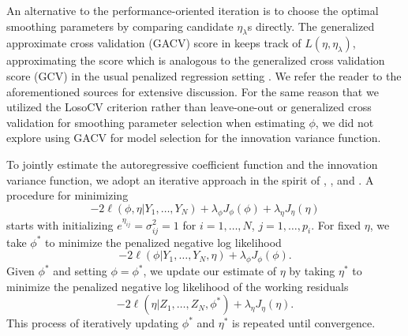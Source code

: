 \bigskip

An alternative to the performance-oriented iteration is to choose the optimal smoothing parameters by comparing candidate $\eta_\lambda$s directly. The generalized approximate cross validation (GACV) score in \cite{xiang1996generalized} keeps track of $L\left( \eta,\eta_\lambda \right)$, approximating the score which is analogous to the generalized cross validation score (GCV) in the usual penalized regression setting \citep{wahba1990spline}. We refer the reader to the aforementioned sources for extensive discussion. For the same reason that we utilized the LosoCV criterion rather than leave-one-out or generalized cross validation for smoothing parameter selection when estimating $\phi$, we did not explore using GACV for model selection for the innovation variance function.

\bigskip

To jointly estimate the autoregressive coefficient function and the innovation variance function, we adopt an iterative approach in the spirit of \cite{huang2006covariance}, \cite{huang2007estimation}, and \cite{pourahmadi2000maximum}. A procedure for minimizing 
\[
-2\ell\left(\phi,\eta \vert Y_1, \dots, Y_N  \right) + \lambda_\phi  J_\phi\left(\phi\right) + \lambda_\eta  J_\eta\left(\eta\right)
\]
starts with initializing $e^{\eta_{ij}} = \sigma^2_{ij} = 1$ for $i = 1,\dots, N$, $j = 1,\dots, p_i$.  For fixed $\eta$, we take $\phi^*$ to minimize the penalized negative log likelihood 
\[
-2\ell\left(\phi\vert Y_1, \dots, Y_N, \eta\right) + \lambda_\phi  J_\phi\left(\phi\right).
\]
\noindent
Given $\phi^*$ and setting $\phi = \phi^*$, we update our estimate of $\eta$ by taking $\eta^*$ to minimize the penalized negative log likelihood of the working residuals  
\[
-2\ell\left( \eta \vert Z_1,\dots, Z_N, \phi^* \right) + \lambda_\eta  J_\eta\left(\eta\right).
\]
This process of iteratively updating $\phi^*$ and ${\eta}^*$ is repeated until convergence. 




